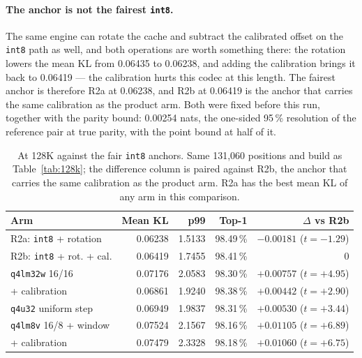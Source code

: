 \documentclass[10pt,twocolumn]{article}
\begin{document}
\paragraph{The anchor is not the fairest \texttt{int8}.} The same engine can rotate the cache and subtract the calibrated offset on the \texttt{int8} path as well, and both operations are worth something there: the rotation lowers the mean KL from 0.06435 to 0.06238, and adding the calibration brings it back to 0.06419 --- the calibration hurts this codec at this length. The fairest anchor is therefore R2a at 0.06238, and R2b at 0.06419 is the anchor that carries the same calibration as the product arm. Both were fixed before this run, together with the parity bound: 0.00254 nats, the one-sided 95\,\% resolution of the reference pair at true parity, with the point bound at half of it.

\begin{table}[t]
\centering
\footnotesize
\caption{At 128K against the fair \texttt{int8} anchors. Same 131,060 positions and build as Table~\ref{tab:128k}; the difference column is paired against R2b, the anchor that carries the same calibration as the product arm. R2a has the best mean KL of any arm in this comparison.}
\label{tab:128k-fair}
\setlength{\tabcolsep}{3pt}
\begin{tabular}{@{}lrrrr@{}}
\toprule
Arm & Mean KL & p99 & Top-1 & $\Delta$ vs R2b \\
\midrule
R2a: \texttt{int8} + rotation & 0.06238 & 1.5133 & 98.49\,\% & $-0.00181$ ($t{=}-1.29$) \\
R2b: \texttt{int8} + rot. + cal. & 0.06419 & 1.7455 & 98.41\,\% & 0 \\
\texttt{q4lm32w} 16/16 & 0.07176 & 2.0583 & 98.30\,\% & $+0.00757$ ($t{=}+4.95$) \\
\quad + calibration & 0.06861 & 1.9240 & 98.38\,\% & $+0.00442$ ($t{=}+2.90$) \\
\texttt{q4u32} uniform step & 0.06949 & 1.9837 & 98.31\,\% & $+0.00530$ ($t{=}+3.44$) \\
\texttt{q4lm8v} 16/8 + window & 0.07524 & 2.1567 & 98.16\,\% & $+0.01105$ ($t{=}+6.89$) \\
\quad + calibration & 0.07479 & 2.3328 & 98.18\,\% & $+0.01060$ ($t{=}+6.75$) \\
\bottomrule
\end{tabular}
\end{table}
\end{document}
